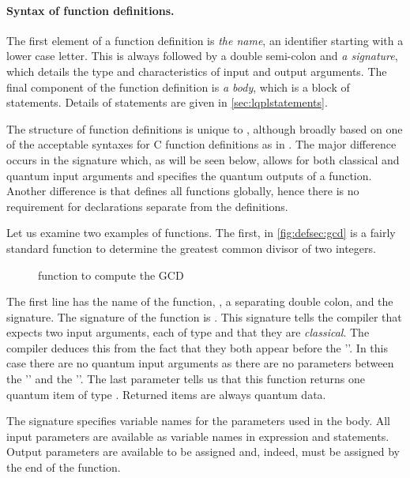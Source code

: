 \paragraph{Syntax of function definitions.} 
The first element of a function definition is
\emph{the name}, an identifier starting with a 
lower case letter. This is always followed by a double semi-colon and 
\emph{a signature}, which details the type and characteristics 
of input and output arguments. The final component of the 
function definition is
\emph{a body}, which is a block of \lqpl{} statements. 
Details of statements are given in \vref{sec:lqplstatements}.

The structure of function definitions is unique to \lqpl, although
broadly based on one of the acceptable syntaxes for C function definitions
as in \cite{kernighan:c}. The major difference occurs in the signature
which, as will be seen below, allows for both classical and quantum input
arguments and specifies the quantum outputs of a function. Another difference
is that \lqpl{} defines all functions globally, hence there is no
requirement for declarations separate from the definitions.

Let us examine two examples of functions. The first, in \vref{fig:defsec:gcd}
 is a fairly 
standard function to determine the greatest common divisor of two 
integers.

\begin{figure}[htbp]
\begin{singlespace}

\end{singlespace}
\caption{\lqpl{} function to compute the GCD}\label{fig:defsec:gcd}
\end{figure}

The first line has  the name of the function, , a separating double colon, and
 the signature. 
The signature of the function is  .
This signature tells the compiler that  expects
two input arguments, each of type  and that they are
 \emph{classical}. The compiler deduces this
from the fact that they both appear before the '\inlqpl{|}'.
In this case there are no  quantum input arguments
as there are no parameters between the '\inlqpl{|}' and the
'\inlqpl{;}'. The last parameter tells us that this function returns
one quantum item of type . Returned items are always  
quantum data.

The signature specifies variable names for the parameters
 used in the body. All input parameters are available as variable
names in expression and statements. Output parameters are available to be
assigned and, indeed, must be assigned by the end of the function.


